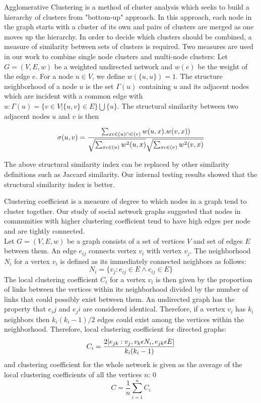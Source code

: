 Agglomerative Clustering \cite{agglo} is a method of cluster analysis which seeks to build a hierarchy of clusters from "bottom-up" approach. In this approach, each node in the graph starts with a cluster of its own and pairs of clusters are merged as one moves up the hierarchy. In order to decide which clusters should be combined, a measure of similarity between sets of clusters is required. Two measures are used in our work to combine single node clusters and multi-node clusters:
Let $ G = (V,E,w) $ be a weighted undirected network and $ w(e) $ be the weight of the edge $ e $. For a node $ u \in V $, we define $ w(\{u,u\}) = 1 $. The structure neighborhood of a node $ u $ is the set $ \Gamma(u) $ containing $ u $ and its adjacent nodes which are incident with a common edge with $ u : \Gamma(u) = \{v \in V|\{u,v\} \in E\} \bigcup \{u\}$. The structural similarity \cite{shrink} between two adjacent nodes $ u $ and $ v $ is then
	
	$$\large \sigma (u,v) = \frac{\sum_{x \epsilon \in (u)\cap \in (v)} w(u,x).w(v,x))}{\sqrt{\sum_{x\epsilon \in (u)}w^2(u,x)}\sqrt{\sum_{x\epsilon \in (v)}w^2(v,x)}}$$
	
	The above structural similarity index can be replaced by other similarity definitions such as Jaccard similarity. Our internal testing results showed that the structural similarity index is better.

Clustering coefficient \cite{clustcoeff} is a measure of degree to which nodes in a graph tend to cluster together. Our study of social network graphs suggested that nodes in communities with higher clustering coefficient tend to have high edges per node and are tightly connected.\\
	Let $ G = (V,E,w)$ be a graph consists of a set of vertices $ V $ and set of edges $ E $ between them. An edge $ e_{ij} $ connects vertex $ v_i $ with vertex $ v_j $. The neighborhood $ N_i $ for a vertex $ v_i $ is defined as its immediately connected neighbors as follows: 
	$$ N_i = \{ v_j: e_{ij} \in E \wedge e_{ij} \in E \}$$
	The local clustering coefficient $ C_i $ for a vertex $ v_i $ is then given by the proportion of links between the vertices within its neighborhood divided by the number of links that could possibly exist between them. An undirected graph has the property that $ e_ij $ and $ e_ji $ are considered identical. Therefore, if a vertex $ v_i $ has $ k_i $ neighbors then $ k_i(k_i - 1)/2 $ edges could exist among the vertices within the neighborhood. Therefore, local clustering coefficient for directed graphs: 
		$$\large C_i = \frac{2|{e_{jk}:v_j, v_k \epsilon N_i, e_{jk} \epsilon E}|}{k_i(k_i-1)}$$
	and clustering coefficient for the whole network is given as the average of the local clustering coefficients of all the vertices $ n $:
0		$$ C = \frac{1}{n} \sum_{i=1}^{n} C_i$$


